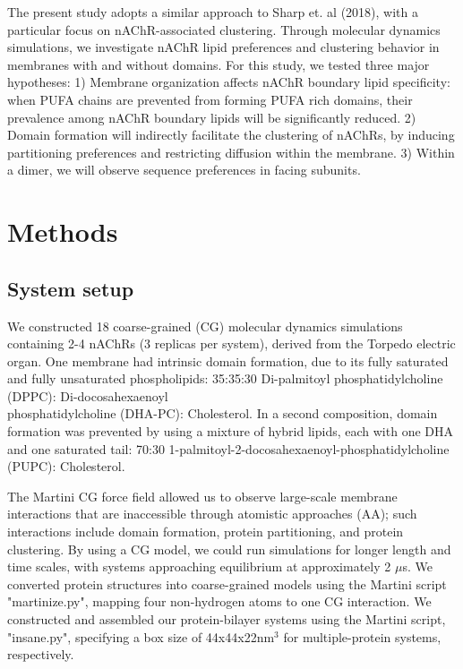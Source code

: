The present study adopts a similar approach to Sharp et. al (2018), with a particular focus on nAChR-associated clustering. Through molecular dynamics simulations, we investigate nAChR lipid preferences and clustering behavior in membranes with and without domains. For this study, we tested three major hypotheses: 1) Membrane organization affects nAChR boundary lipid specificity: when PUFA chains are prevented from forming PUFA rich domains, their prevalence among nAChR boundary lipids will be significantly reduced. 2) Domain formation will indirectly facilitate the clustering of nAChRs, by inducing partitioning preferences and restricting diffusion within the membrane. 3) Within a dimer, we will observe sequence preferences in facing subunits.
\section{Methods}
\subsection{System setup}

We constructed 18 coarse-grained (CG) molecular dynamics simulations containing 2-4 nAChRs (3 replicas per system), derived from the Torpedo electric organ\cite{Unwin2005}. One membrane had intrinsic domain formation, due to its fully saturated and fully unsaturated phospholipids: 35:35:30 Di-palmitoyl phosphatidylcholine (DPPC): Di-docosahexaenoyl\\ phosphatidylcholine (DHA-PC): Cholesterol. In a second composition, domain formation was prevented by using a mixture of hybrid lipids, each with one DHA and one saturated tail: 70:30 1-palmitoyl-2-docosahexaenoyl-phosphatidylcholine (PUPC): Cholesterol. \cite{Marrink2007}




The Martini CG force field allowed us to observe large-scale membrane interactions that are inaccessible through atomistic approaches (AA); such interactions include domain formation, protein partitioning, and protein clustering. By using a CG model, we could run simulations for longer length and time scales, with systems approaching equilibrium at approximately 2 $\mu$s.  \cite{Marrink2007}
We converted protein structures into coarse-grained models using the Martini script "martinize.py", mapping four non-hydrogen atoms to one CG interaction. We constructed and assembled our protein-bilayer systems using  the Martini script, "insane.py", specifying a box size of 44x44x22nm$^{3}$ for multiple-protein systems, respectively.  \cite{Marrink2007}
 






